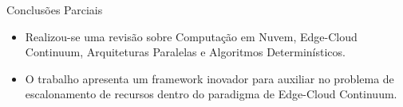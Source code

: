 \begin{frame}{Conclusões Parciais}
    \begin{itemize}
        \item Realizou-se uma revisão sobre Computação em Nuvem, Edge-Cloud Continuum, Arquiteturas Paralelas e Algoritmos Determinísticos.
        \item O trabalho apresenta um framework inovador para auxiliar no problema de escalonamento de recursos dentro do paradigma de Edge-Cloud Continuum.
    \end{itemize}
\end{frame}